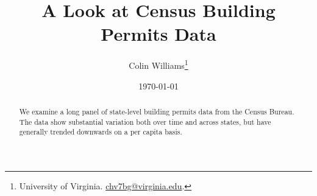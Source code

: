 \documentclass[12pt]{article}
\title{A Look at Census Building Permits Data}
\author{Colin Williams\thanks{University of Virginia.
\href{mailto:chv7bg@virginia.edu}{chv7bg@virginia.edu}.}} %
\date{\today}
\begin{document}
\bgroup
\let\footnoterule\relax

\begin{singlespace}
\maketitle

\begin{abstract}
\noindent We examine a long panel of state-level building permits data from the Census Bureau. The data show substantial variation both over time and across states, but have generally trended downwards on a per capita basis.
\end{abstract}
\end{singlespace}

\thispagestyle{empty}
\clearpage
\egroup
\setcounter{page}{1}

\noindent

\end{document}
